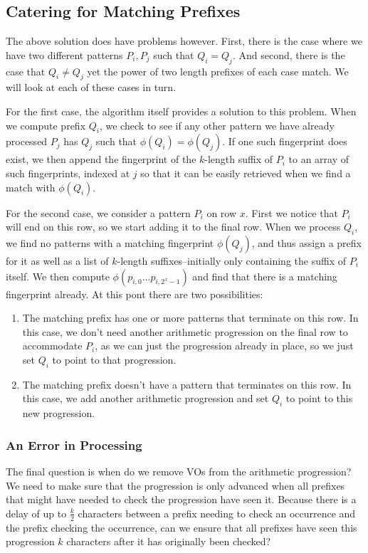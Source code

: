 \documentclass[ %
                    author={Dominic Joseph Moylett},
                    degree={MEng},
                     title={Dictionary Matching with Fingerprints},
                  subtitle={An Empirical Analysis},
                      type={Research},
                      year={2014} ]{dissertation}
\begin{document}
\subsection{Catering for Matching Prefixes}

The above solution does have problems however. First, there is the case where we have two different patterns $P_i, P_j$ such that $Q_i = Q_j$. And second, there is the case that $Q_i \neq Q_j$ yet the power of two length prefixes of each case match. We will look at each of these cases in turn.

For the first case, the algorithm itself provides a solution to this problem. When we compute prefix $Q_i$, we check to see if any other pattern we have already processed $P_j$ has $Q_j$ such that $\phi(Q_i) = \phi(Q_j)$. If one such fingerprint does exist, we then append the fingerprint of the $k$-length suffix of $P_i$ to an array of such fingerprints, indexed at $j$ so that it can be easily retrieved when we find a match with $\phi(Q_i)$.

For the second case, we consider a pattern $P_i$ on row $x$. First we notice that $P_i$ will end on this row, so we start adding it to the final row. When we process $Q_i$, we find no patterns with a matching fingerprint $\phi(Q_j)$, and thus assign a prefix for it as well as a list of $k$-length suffixes--initially only containing the suffix of $P_i$ itself. We then compute $\phi(p_{i,0}...p_{i,2^x-1})$ and find that there is a matching fingerprint already. At this pont there are two possibilities:

\begin{enumerate}
  \item The matching prefix has one or more patterns that terminate on this row. In this case, we don't need another arithmetic progression on the final row to accommodate $P_i$, as we can just the progression already in place, so we just set $Q_i$ to point to that progression.
  \item The matching prefix doesn't have a pattern that terminates on this row. In this case, we add another arithmetic progression and set $Q_i$ to point to this new progression.
\end{enumerate}

\subsubsection{An Error in Processing}

The final question is when do we remove VOs from the arithmetic progression? We need to make sure that the progression is only advanced when all prefixes that might have needed to check the progression have seen it. Because there is a delay of up to $\frac{k}{2}$ characters between a prefix needing to check an occurrence and the prefix checking the occurrence, can we ensure that all prefixes have seen this progression $k$ characters after it has originally been checked?
\end{document}
